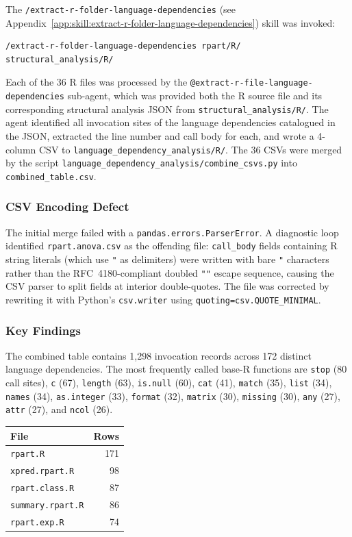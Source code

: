\documentclass[12pt]{article}
\newcommand{\skillapp}[2]{\texttt{/#1} (see Appendix~\ref{app:skill:#2})}
\begin{document}
The \skillapp{extract-r-folder-language-dependencies}{extract-r-folder-language-dependencies} skill was invoked:
\begin{lstlisting}[style=skill]
/extract-r-folder-language-dependencies rpart/R/ structural_analysis/R/
\end{lstlisting}

Each of the 36 R files was processed by the \texttt{@extract-r-file-language-dependencies} sub-agent, which was provided both the R source file and its corresponding structural analysis JSON from \texttt{structural\_analysis/R/}. The agent identified all invocation sites of the language dependencies catalogued in the JSON, extracted the line number and call body for each, and wrote a 4-column CSV to \texttt{language\_dependency\_analysis/R/}. The 36 CSVs were merged by the script \texttt{language\_dependency\_analysis/combine\_csvs.py} into \texttt{combined\_table.csv}.

\subsubsection{CSV Encoding Defect}

The initial merge failed with a \texttt{pandas.errors.ParserError}. A diagnostic loop identified \texttt{rpart.anova.csv} as the offending file: \texttt{call\_body} fields containing R string literals (which use \texttt{"} as delimiters) were written with bare \texttt{"} characters rather than the RFC~4180-compliant doubled \texttt{""} escape sequence, causing the CSV parser to split fields at interior double-quotes. The file was corrected by rewriting it with Python's \texttt{csv.writer} using \texttt{quoting=csv.QUOTE\_MINIMAL}.

\subsubsection{Key Findings}

The combined table contains 1,298 invocation records across 172 distinct language dependencies. The most frequently called base-R functions are \texttt{stop} (80 call sites), \texttt{c} (67), \texttt{length} (63), \texttt{is.null} (60), \texttt{cat} (41), \texttt{match} (35), \texttt{list} (34), \texttt{names} (34), \texttt{as.integer} (33), \texttt{format} (32), \texttt{matrix} (30), \texttt{missing} (30), \texttt{any} (27), \texttt{attr} (27), and \texttt{ncol} (26).

\medskip
\begin{center}
\begin{tabular}{lr}
\toprule
File & Rows \\
\midrule
\texttt{rpart.R} & 171 \\
\texttt{xpred.rpart.R} & 98 \\
\texttt{rpart.class.R} & 87 \\
\texttt{summary.rpart.R} & 86 \\
\texttt{rpart.exp.R} & 74 \\
\bottomrule
\end{tabular}
\end{center}
\medskip
\end{document}
